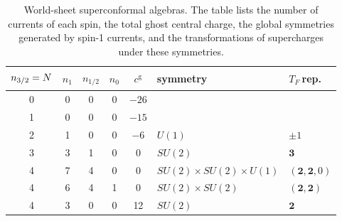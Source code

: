\begin{table}[ht]
	\caption{World-sheet superconformal algebras. The table lists the number of currents of each spin, the total ghost central charge, the global symmetries generated by spin-1 currents, and the transformations of supercharges under these symmetries.}
	\label{tab:11.1}%
	\centering
	\begin{tabular}[c]{cccccll}
		\hline\hline
		$\vphantom{\Big[}n_{3/2}=N$ & $n_{1}$ & $n_{1/2}$ & $n_{0}$ & $c^{\text{g}}$ & symmetry & $T_{F}\:$rep. \\
		\hline
		0 & 0 & 0 & 0 & $-26$ & &  \\
		1 & 0 & 0 & 0 & $-15$ & &  \\
		2 & 1 & 0 & 0 & $-6$ & $U(1)$ & $\pm1$  \\
		3 & 3 & 1 & 0 & 0 & $SU(2)$ & $\mathbf{3}$  \\
		4 & 7 & 4 & 0 & 0 & $SU(2)\times SU(2)\times U(1)$ & $(\mathbf{2},\mathbf{2},0)$  \\
		4 & 6 & 4 & 1 & 0 & $SU(2)\times SU(2)$ & $(\mathbf{2},\mathbf{2})$  \\
		4 & 3 & 0 & 0 & 12 & $SU(2)$ & $\mathbf{2}$  \\
		\hline\hline
	\end{tabular}
\end{table}

